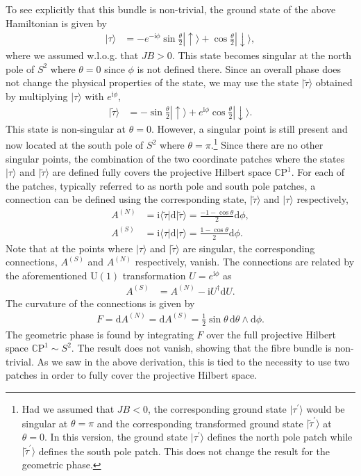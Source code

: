 \documentclass[a4paper,11pt]{article}
\newcommand{\CP}[1]{\mathds{C}\text{P}^{#1}}
\renewcommand{\i}{\text{i}}
\renewcommand{\d}{\text{d}}
\newcommand{\U}{\text{U}}
\newcommand{\1}{\mathds{1}}
\newcommand{\p}{{\prime}}
\begin{document}
To see explicitly that this bundle is non-trivial, the ground state of the above Hamiltonian is given by
\begin{align}
    |\tau\rangle&=-e^{-\i\phi}\sin\frac{\theta}{2}|\!\uparrow\rangle+\cos\frac{\theta}{2}|\!\downarrow\rangle,
\end{align}
where we assumed w.l.o.g. that $JB>0$. This state becomes singular at the north pole of $S^2$ where $\theta=0$ since $\phi$ is not defined there. Since an overall phase does not change the physical properties of the state, we may use the state $|\tilde\tau\rangle$ obtained by multiplying $|\tau\rangle$ with $e^{\i\phi}$,
\begin{align}
    |\tilde\tau\rangle&=-\sin\frac{\theta}{2}|\!\uparrow\rangle+e^{\i\phi}\cos\frac{\theta}{2}|\!\downarrow\rangle.
\end{align}
This state is non-singular at $\theta=0$. However, a singular point is still present and now located at the south pole of $S^2$ where $\theta=\pi$.\footnote{Had we assumed that $JB<0$, the corresponding ground state $|\tau^\p\rangle$ would be singular at $\theta=\pi$ and the corresponding transformed ground state $|\tilde{\tau}^\p\rangle$ at $\theta=0$. In this version, the ground state $|\tau^\p\rangle$ defines the north pole patch while $|\tilde{\tau}^\p\rangle$ defines the south pole patch. This does not change the result for the geometric phase.} Since there are no other singular points, the combination of the two coordinate patches where the states $|\tau\rangle$ and $|\tilde\tau\rangle$ are defined fully covers the projective Hilbert space $\CP{1}$. For each of the patches, typically referred to as north pole and south pole patches, a connection can be defined using the corresponding state, $|\tilde\tau\rangle$ and $|\tau\rangle$ respectively,
\begin{align}
    A^{(N)}&=\i\langle\tilde\tau|\d|\tilde\tau\rangle=\frac{-1-\cos\theta}{2}\d\phi,\\
    A^{(S)}&=\i\langle\tau|\d|\tau\rangle=\frac{1-\cos\theta}{2}\d\phi.
\end{align}
Note that at the points where $|\tau\rangle$ and $|\tilde{\tau}\rangle$ are singular, the corresponding connections, $A^{(S)}$ and $A^{(N)}$ respectively, vanish. The connections are related by the aforementioned $\U(1)$ transformation $U=e^{\i\phi}$ as
\begin{align}
    A^{(S)}&=A^{(N)}-\i U^\dagger\d U.
\end{align}
The curvature of the connections is given by
\begin{align}
    F=\d A^{(N)}=\d A^{(S)}=\frac{1}{2}\sin\theta\,\d\theta\wedge\d\phi.\label{eq:BerryCurvature}
\end{align}
The geometric phase is found by integrating $F$ over the full projective Hilbert space $\CP{1}\sim S^2$. The result does not vanish, showing that the fibre bundle is non-trivial. As we saw in the above derivation, this is tied to the necessity to use two patches in order to fully cover the projective Hilbert space.
\end{document}
